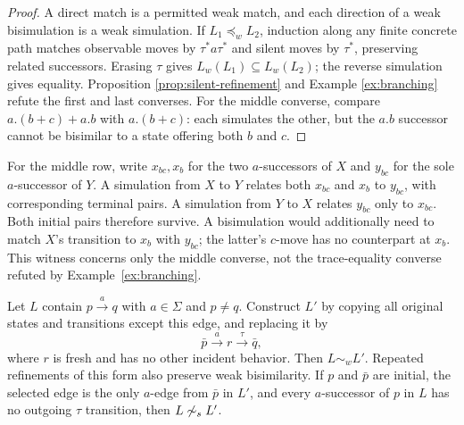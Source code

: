 \documentclass{ws-jbcb}
\numberwithin{equation}{section}
\newcommand{\TAU}{\tau}
\newcommand{\strongsim}{\mathrel{\sim_{s}}}
\newcommand{\weaksim}{\mathrel{\sim_{w}}}
\newcommand{\weakpre}{\mathrel{\preceq_{w}}}
\begin{document}
\begin{proof}
A direct match is a permitted weak match, and each direction of a weak
bisimulation is a weak simulation. If $L_1\weakpre L_2$, induction along any
finite concrete path matches observable moves by $\TAU^*a\TAU^*$ and silent
moves by $\TAU^*$, preserving related successors. Erasing $\TAU$ gives
$L_w(L_1)\subseteq L_w(L_2)$; the reverse simulation gives equality.
Proposition \ref{prop:silent-refinement} and Example \ref{ex:branching} refute
the first and last converses. For the middle converse, compare
$a.(b+c)+a.b$ with $a.(b+c)$: each simulates the other, but the $a.b$ successor
cannot be bisimilar to a state offering both $b$ and $c$.
\end{proof}


\begin{table}[t]
\end{table}

For the middle row, write $x_{bc},x_b$ for the two $a$-successors of $X$ and
$y_{bc}$ for the sole $a$-successor of $Y$. A simulation from $X$ to $Y$
relates both $x_{bc}$ and $x_b$ to $y_{bc}$, with corresponding terminal
pairs. A simulation from $Y$ to $X$ relates $y_{bc}$ only to $x_{bc}$.
Both initial pairs therefore survive. A bisimulation would additionally need
to match $X$'s transition to $x_b$ with $y_{bc}$; the latter's $c$-move has
no counterpart at $x_b$. This witness concerns only the middle converse,
not the trace-equality converse refuted by Example~\ref{ex:branching}.

\begin{proposition}
\label{prop:silent-refinement}
Let $L$ contain $p\xrightarrow{a}q$ with $a\in\Sigma$ and $p\neq q$. Construct
$L'$ by copying all original states and transitions except this edge, and replacing
it by
\begin{equation}\label{eq:silent-refinement}
 \bar p\xrightarrow{a}r\xrightarrow{\TAU}\bar q,
\end{equation}
where $r$ is fresh and has no other incident behavior. Then $L\weaksim L'$.
Repeated refinements of this form also preserve weak bisimilarity. If $p$ and
$\bar p$ are initial, the selected edge is the only $a$-edge from $\bar p$ in
$L'$, and every $a$-successor of $p$ in $L$ has no outgoing $\TAU$ transition,
then $L\not\strongsim L'$.
\end{proposition}
\end{document}
